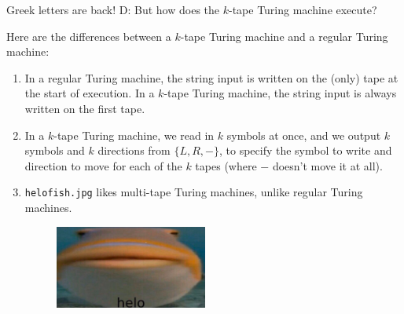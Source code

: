 \documentclass{beamer}
\begin{document}
\begin{frame}{Greek letters are back! D:}
But how does the $k$-tape Turing machine execute?

Here are the differences between a $k$-tape Turing machine and a regular Turing machine:
\begin{enumerate}
\item In a regular Turing machine, the string input is written on the (only) tape at the start of execution. In a $k$-tape Turing machine, the string input is always written on the first tape.
\item In a $k$-tape Turing machine, we read in $k$ symbols at once, and we output $k$ symbols and $k$ directions from $\{L, R, -\}$, to specify the symbol to write and direction to move for each of the $k$ tapes (where $-$ doesn't move it at all).
\item \texttt{helo\textunderscore fish.jpg} likes multi-tape Turing machines, unlike regular Turing machines.
\begin{figure}[h]
\centering
\includegraphics[width=5cm]{img/helo_fish.jpg}
\end{figure}
\end{enumerate}
\end{frame}
\end{document}
